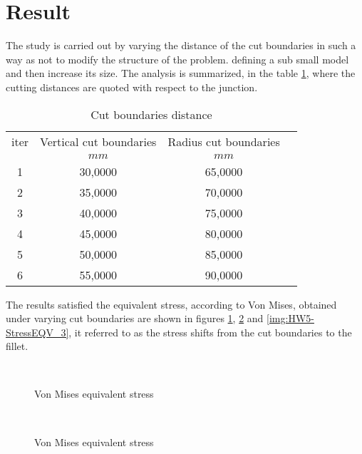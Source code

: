 \section{Result}
The study is carried out by varying the distance of the cut boundaries in such a way as not to modify the structure of the problem. defining a sub small model and then increase its size. The analysis is summarized, in the table \ref{tab:HW5_iter}, where the cutting distances are quoted with respect to the junction.\\
\begin{table}[htb]
\centering
\begin{tabular}{cccc}
\hline
       iter&   Vertical cut  boundaries  &     Radius cut boundaries\\ 
       		 &		$mm$                          &       $mm$\\     
\hline
        1	&		30,0000   &    65,0000\\
        2	&    	35,0000   &    70,0000\\
        3 &   	40,0000   &    75,0000\\
        4 &    	45,0000   &    80,0000\\
        5 &    	50,0000   &    85,0000\\
        6 &    	55,0000   &    90,0000\\
\hline
\end{tabular}
\caption{Cut boundaries distance}
\label{tab:HW5_iter}
\end{table}
\newpage
\noindent The results satisfied the equivalent stress, according to Von Mises, obtained under varying cut boundaries are shown in figures \ref{img:HW5-StressEQV_1}, \ref{img:HW5-StressEQV_2} and \ref{img:HW5-StressEQV_3}, it referred to as the stress shifts from the cut boundaries to the fillet.
\begin{figure}[!h]
\centering
{}\,
\caption{Von Mises equivalent stress}
\label{img:HW5-StressEQV_1}
\end{figure}
\begin{figure}[!h]
\centering
{}\,
\caption{Von Mises equivalent stress}
\label{img:HW5-StressEQV_2}
\end{figure}
